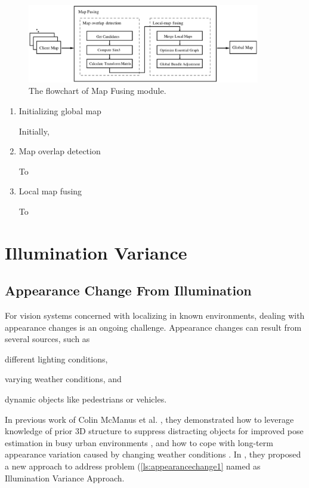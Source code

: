 \begin{figure}[H]
	\centering
	\includegraphics[width=4in]{Chapter2/corbslamserver.eps}
	\caption{The flowchart of Map Fusing module.}
	\label{fig:corbslamserver} 
\end{figure}

\begin{enumerate}[1.]
	\item Initializing global map
	
	Initially,
	
	\item Map overlap detection
	
	To
	
	\item Local map fusing 
	
	To 
\end{enumerate}

\section{Illumination Variance}

\subsection{Appearance Change From Illumination}
For vision systems concerned with localizing in known environments, dealing with appearance changes is an ongoing challenge. Appearance changes can result from several sources, such as 
\begin{inparaenum}[(i)]
	\item different lighting conditions,	
		\label{ls:appearancechange1}
	\item varying weather conditions, and
		\label{ls:appearancechange2}
	\item dynamic objects like pedestrians or vehicles.
		\label{ls:appearancechange3}
\end{inparaenum}

In previous work of Colin McManus et al. , they demonstrated how to leverage knowledge of prior 3D structure to suppress distracting objects for improved pose estimation in busy urban environments \cite{mcmanus2013distraction}, and how to cope with long-term appearance variation caused by changing weather conditions \cite{churchill2012practice}. In \cite{maddern2014illumination}, they proposed a new approach to address problem (\ref{ls:appearancechange1} named as Illumination Variance Approach. 

